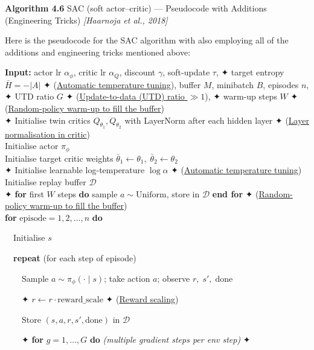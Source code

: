 \documentclass[11pt]{article}
\begin{document}
    \begin{pseudobox}

\textbf{Algorithm 4.6} SAC (soft actor--critic) --- Pseudocode with
Additions (Engineering Tricks) \emph{{[}Haarnoja et al., 2018{]}}

\tcbline

Here is the pseudocode for the SAC algorithm with also employing all of
the additions and engineering tricks mentioned above:

\textbf{Input:} actor lr \(\alpha_\phi\), critic lr \(\alpha_Q\),
discount \(\gamma\), soft-update \(\tau\), ✦ target entropy
\(\bar{H} = -|A|\) ✦ (\hyperref[trick-4-6-1]{Automatic temperature
tuning}), buffer \(M\), minibatch \(B\), episodes \(n\), ✦ UTD ratio
\(G\) ✦ (\hyperref[trick-4-6-2]{Update-to-data (UTD) ratio \(\gg 1\)}),
✦ warm-up steps \(W\) ✦ (\hyperref[trick-4-6-4]{Random-policy warm-up to
fill the buffer})\\
✦ Initialise twin critics \(Q_{\theta_1}, Q_{\theta_2}\) with LayerNorm
after each hidden layer ✦ (\hyperref[trick-4-6-3]{Layer normalisation in
critic})\\
Initialise actor \(\pi_\phi\)\\
Initialise target critic weights
\(\bar{\theta}_1 \leftarrow \theta_1,\;\bar{\theta}_2 \leftarrow \theta_2\)\\
✦ Initialise learnable log-temperature \(\log\alpha\) ✦
(\hyperref[trick-4-6-1]{Automatic temperature tuning})\\
Initialise replay buffer \(\mathcal{D}\)\\
✦ \textbf{for} first \(W\) steps \textbf{do} sample
\(a \sim \mathrm{Uniform}\), store in \(\mathcal{D}\) \textbf{end for} ✦
(\hyperref[trick-4-6-4]{Random-policy warm-up to fill the buffer})\\
\textbf{for} \(\text{episode} = 1, 2, \ldots, n\) \textbf{do}\\
\strut ~~Initialise \(s\)\\
\strut ~~\textbf{repeat} (for each step of episode)\\
\strut ~~~~Sample \(a \sim \pi_\phi(\cdot \mid s)\); take action \(a\);
observe \(r,\; s',\; \text{done}\)\\
\strut ~~~~✦ \(r \leftarrow r \cdot \text{reward\_scale}\) ✦
(\hyperref[trick-4-6-5]{Reward scaling})\\
\strut ~~~~Store \((s, a, r, s', \text{done})\) in \(\mathcal{D}\)\\
\strut ~~~~✦ \textbf{for} \(g = 1, \ldots, G\) \textbf{do}
\emph{(multiple gradient steps per env step)} ✦

\end{pseudobox}
\end{document}
